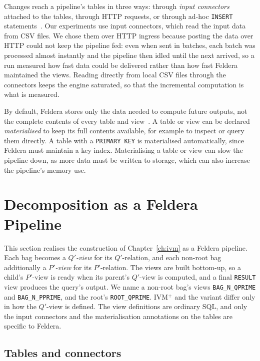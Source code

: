 Changes reach a pipeline's tables in three ways: through \emph{input connectors} attached to the tables, through HTTP requests, or through ad-hoc \texttt{INSERT} statements~\cite{feldera2026}.
Our experiments use input connectors, which read the input data from CSV files.
We chose them over HTTP ingress because posting the data over HTTP could not keep the pipeline fed: even when sent in batches, each batch was processed almost instantly and the pipeline then idled until the next arrived, so a run measured how fast data could be delivered rather than how fast Feldera maintained the views. Reading directly from local CSV files through the connectors keeps the engine saturated, so that the incremental computation is what is measured.

By default, Feldera stores only the data needed to compute future outputs, not the complete contents of every table and view~\cite{feldera2026}.
A table or view can be declared \emph{materialised} to keep its full contents available, for example to inspect or query them directly.
A table with a \texttt{PRIMARY KEY} is materialised automatically, since Feldera must maintain a key index.
Materialising a table or view can slow the pipeline down, as more data must be written to storage, which can also increase the pipeline's memory use.

\section{Decomposition as a Feldera Pipeline}
\label{sec:pipeline}

This section realises the construction of Chapter~\ref{ch:ivm} as a Feldera pipeline.
Each bag becomes a \emph{$Q'$-view} for its $Q'$-relation, and each non-root bag additionally a \emph{$P'$-view} for its $P'$-relation.
The views are built bottom-up, so a child's $P'$-view is ready when its parent's $Q'$-view is computed, and a final \texttt{RESULT} view produces the query's output.
We name a non-root bag's views \texttt{BAG\_N\_QPRIME} and \texttt{BAG\_N\_PPRIME}, and the root's \texttt{ROOT\_QPRIME}.
IVM$^+$ and the variant differ only in how the $Q'$-view is defined.
The view definitions are ordinary SQL, and only the input connectors and the materialisation annotations on the tables are specific to Feldera.

\subsection{Tables and connectors}


